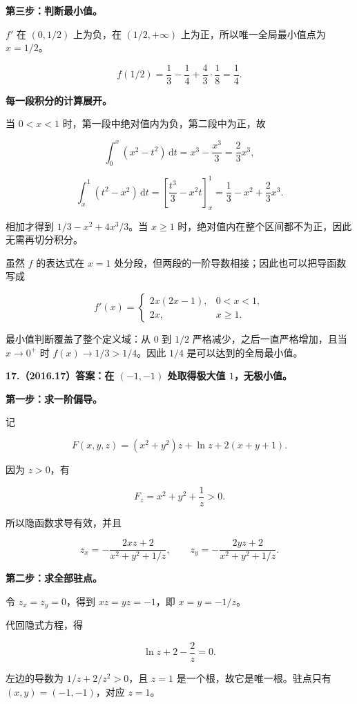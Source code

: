 \documentclass[UTF8,11pt,fontset=windows]{ctexart}
\begin{document}
\textbf{第三步：判断最小值。}

$f'$ 在 $(0,1/2)$ 上为负，在 $(1/2,+\infty)$ 上为正，所以唯一全局最小值点为 $x=1/2$。

$$
f(1/2)=\frac13-\frac14+\frac43\cdot\frac18=\frac14.
$$

\textbf{每一段积分的计算展开。}

当 $0<x<1$ 时，第一段中绝对值内为负，第二段中为正，故

$$
\int_0^x(x^2-t^2)\,\mathrm dt
=x^3-\frac{x^3}{3}=\frac23x^3,
$$

$$
\int_x^1(t^2-x^2)\,\mathrm dt
=\left[\frac{t^3}{3}-x^2t\right]_x^1
=\frac13-x^2+\frac23x^3.
$$

相加才得到 $1/3-x^2+4x^3/3$。当 $x\ge1$ 时，绝对值内在整个区间都不为正，因此无需再切分积分。

虽然 $f$ 的表达式在 $x=1$ 处分段，但两段的一阶导数相接；因此也可以把导函数写成

$$
f'(x)=\begin{cases}
2x(2x-1),&0<x<1,\\
2x,&x\ge1.
\end{cases}
$$

最小值判断覆盖了整个定义域：从 $0$ 到 $1/2$ 严格减少，之后一直严格增加，且当 $x\to0^+$ 时 $f(x)\to1/3>1/4$。因此 $1/4$ 是可以达到的全局最小值。

\clearpage

\textbf{17.（2016.17）答案：在 $(-1,-1)$ 处取得极大值 $1$，无极小值。}

\textbf{第一步：求一阶偏导。}

记

$$
F(x,y,z)=(x^2+y^2)z+\ln z+2(x+y+1).
$$

因为 $z>0$，有

$$
F_z=x^2+y^2+\frac1z>0.
$$

所以隐函数求导有效，并且

$$
z_x=-\frac{2xz+2}{x^2+y^2+1/z},
\qquad
z_y=-\frac{2yz+2}{x^2+y^2+1/z}.
$$

\textbf{第二步：求全部驻点。}

令 $z_x=z_y=0$，得到 $xz=yz=-1$，即 $x=y=-1/z$。

代回隐式方程，得

$$
\ln z+2-\frac2z=0.
$$

左边的导数为 $1/z+2/z^2>0$，且 $z=1$ 是一个根，故它是唯一根。驻点只有 $(x,y)=(-1,-1)$，对应 $z=1$。
\end{document}
